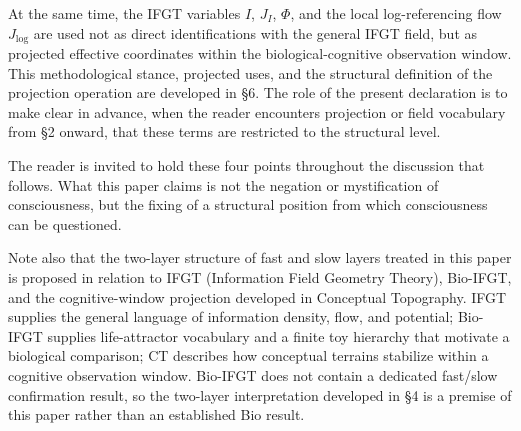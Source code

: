 At the same time, the IFGT variables \(I\), \(J_I\), \(\Phi\), and the local log-referencing flow \(J_{\log}\) are used not as direct identifications with the general IFGT field, but as projected effective coordinates within the biological-cognitive observation window. This methodological stance, projected uses, and the structural definition of the projection operation are developed in §6. The role of the present declaration is to make clear in advance, when the reader encounters projection or field vocabulary from §2 onward, that these terms are restricted to the structural level.

The reader is invited to hold these four points throughout the discussion that follows. What this paper claims is not the negation or mystification of consciousness, but the fixing of a structural position from which consciousness can be questioned.

Note also that the two-layer structure of fast and slow layers treated in this paper is proposed in relation to IFGT (Information Field Geometry Theory), Bio-IFGT, and the cognitive-window projection developed in Conceptual Topography. IFGT supplies the general language of information density, flow, and potential; Bio-IFGT supplies life-attractor vocabulary and a finite toy hierarchy that motivate a biological comparison; CT describes how conceptual terrains stabilize within a cognitive observation window. Bio-IFGT does not contain a dedicated fast/slow confirmation result, so the two-layer interpretation developed in §4 is a premise of this paper rather than an established Bio result.
